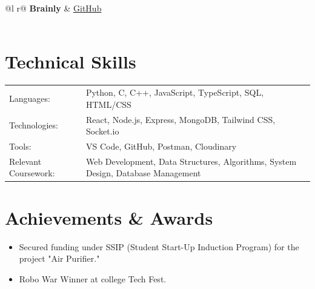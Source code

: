 \documentclass[a4paper,12pt]{article}
\begin{document}
\begin{tabularx}{\linewidth}{@{}l r@{}}
\textbf{Brainly} & \hfill \href{https://github.com/govindggupta/brainly}{GitHub} \\[3.75pt]
 \\
\end{tabularx}
\vspace{8pt}



\section{Technical Skills}
\begin{tabularx}{\linewidth}{@{}l X@{}}
Languages: &  Python, C, C++, JavaScript, TypeScript, SQL, HTML/CSS \\
Technologies: & React, Node.js, Express, MongoDB, Tailwind CSS, Socket.io \\
Tools: & VS Code, GitHub, Postman, Cloudinary \\
Relevant Coursework: & Web Development, Data Structures, Algorithms, System Design, Database Management \\
\end{tabularx}

\section{Achievements \& Awards}
\begin{itemize}[nosep, leftmargin=1em, label=--]
  \item Secured funding under SSIP (Student Start-Up Induction Program) for the project "Air Purifier."
  \item Robo War Winner at college Tech Fest.
\end{itemize}

\end{document}
